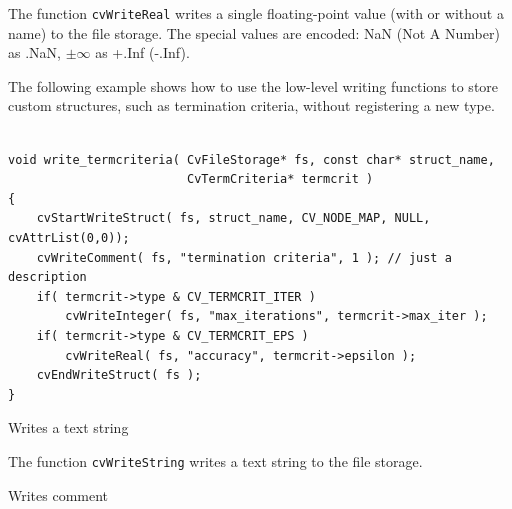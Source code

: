 The function \texttt{cvWriteReal} writes a single floating-point
value (with or without a name) to the file storage. The special
values are encoded: NaN (Not A Number) as .NaN, $ \pm \infty $ as +.Inf
(-.Inf).

The following example shows how to use the low-level writing functions
to store custom structures, such as termination criteria, without
registering a new type.

\begin{lstlisting}

void write_termcriteria( CvFileStorage* fs, const char* struct_name,
                         CvTermCriteria* termcrit )
{
    cvStartWriteStruct( fs, struct_name, CV_NODE_MAP, NULL, cvAttrList(0,0));
    cvWriteComment( fs, "termination criteria", 1 ); // just a description
    if( termcrit->type & CV_TERMCRIT_ITER )
        cvWriteInteger( fs, "max_iterations", termcrit->max_iter );
    if( termcrit->type & CV_TERMCRIT_EPS )
        cvWriteReal( fs, "accuracy", termcrit->epsilon );
    cvEndWriteStruct( fs );
}

\end{lstlisting}

\label{WriteString}

Writes a text string


\begin{description}
\end{description}

The function \texttt{cvWriteString} writes a text string to the file storage.

\label{WriteComment}

Writes comment

